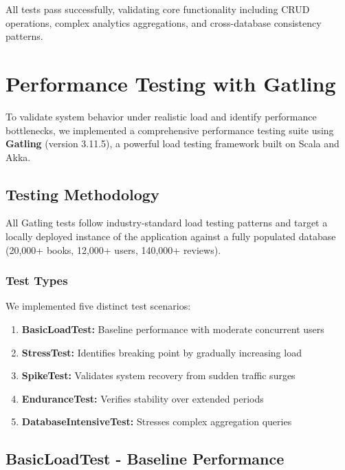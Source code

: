 All tests pass successfully, validating core functionality including CRUD operations, complex analytics aggregations, and cross-database consistency patterns.


\section{Performance Testing with Gatling}

To validate system behavior under realistic load and identify performance bottlenecks, we implemented a comprehensive performance testing suite using \textbf{Gatling} (version 3.11.5), a powerful load testing framework built on Scala and Akka.

\subsection{Testing Methodology}
All Gatling tests follow industry-standard load testing patterns and target a locally deployed instance of the application against a fully populated database (20,000+ books, 12,000+ users, 140,000+ reviews).

\subsubsection{Test Types}
We implemented five distinct test scenarios:

\begin{enumerate}
    \item \textbf{BasicLoadTest:} Baseline performance with moderate concurrent users
    \item \textbf{StressTest:} Identifies breaking point by gradually increasing load
    \item \textbf{SpikeTest:} Validates system recovery from sudden traffic surges
    \item \textbf{EnduranceTest:} Verifies stability over extended periods
    \item \textbf{DatabaseIntensiveTest:} Stresses complex aggregation queries
\end{enumerate}

\subsection{BasicLoadTest - Baseline Performance}

